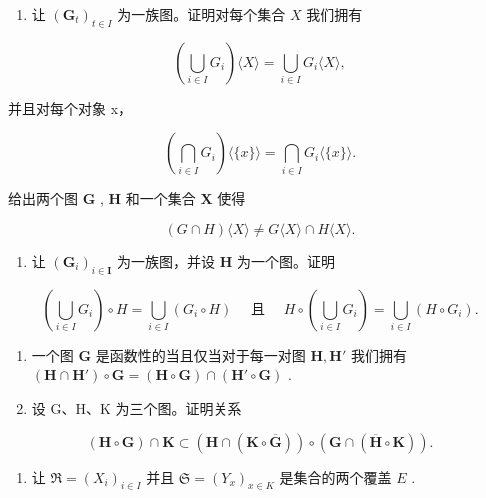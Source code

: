 \begin{enumerate}
\def\labelenumi{\arabic{enumi}.}
\setcounter{enumi}{3}
\tightlist
\item
  让 \((\mathbf{G}_t)_{t\in I}\) 为一族图。证明对每个集合 \(X\) 我们拥有
\end{enumerate}

\[
\left(\bigcup_ {i \in I} G _ {i}\right) \langle X \rangle = \bigcup_ {i \in I} G _ {i} \langle X \rangle ,
\]

并且对每个对象 x，

\[
\left(\bigcap_ {i \in I} G _ {i}\right) \langle \{x \} \rangle = \bigcap_ {i \in I} G _ {i} \langle \{x \} \rangle .
\]

给出两个图 \(\mathbf{G}\) , \(\mathbf{H}\) 和一个集合 \(\mathbf{X}\) 使得

\[
(G \cap H) \langle X \rangle \neq G \langle X \rangle \cap H \langle X \rangle .
\]

\begin{enumerate}
\def\labelenumi{\arabic{enumi}.}
\setcounter{enumi}{4}
\tightlist
\item
  让 \((\mathbf{G}_i)_{i\in \mathbf{I}}\) 为一族图，并设 \(\mathbf{H}\) 为一个图。证明
\end{enumerate}

\[
\left(\bigcup_ {i \in I} G _ {i}\right) \circ H = \bigcup_ {i \in I} (G _ {i} \circ H) \quad \text { 且 } \quad H \circ \left(\bigcup_ {i \in I} G _ {i}\right) = \bigcup_ {i \in I} (H \circ G _ {i}).
\]

\begin{enumerate}
\def\labelenumi{\arabic{enumi}.}
\setcounter{enumi}{5}
\item
  一个图 \(\mathbf{G}\) 是函数性的当且仅当对于每一对图 \(\mathbf{H}, \mathbf{H}'\) 我们拥有 \((\mathbf{H} \cap \mathbf{H}') \circ \mathbf{G} = (\mathbf{H} \circ \mathbf{G}) \cap (\mathbf{H}' \circ \mathbf{G})\) .
\item
  设 G、H、K 为三个图。证明关系
\end{enumerate}

\[
(\mathbf {H} \circ \mathbf {G}) \cap \mathbf {K} \subset (\mathbf {H} \cap (\mathbf {K} \circ \overline {{\mathbf {G}}})) \circ (\mathbf {G} \cap (\overline {{\mathbf {H}}} \circ \mathbf {K})).
\]

\begin{enumerate}
\def\labelenumi{\arabic{enumi}.}
\setcounter{enumi}{7}
\tightlist
\item
  让 \(\Re = (X_{i})_{i\in I}\) 并且 \(\mathfrak{S} = (Y_x)_{x\in K}\) 是集合的两个覆盖 \(E\) .
\end{enumerate}

